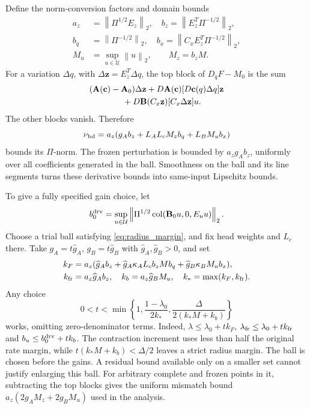 \documentclass[journal]{IEEEtran}
\newcommand{\vz}{\mathbf{z}}
\newcommand{\vc}{\mathbf{c}}
\newcommand{\mA}{\mathbf{A}}
\newcommand{\mB}{\mathbf{B}}
\newcommand{\norm}[1]{\left\lVert #1\right\rVert}
\newcommand{\col}{\operatorname{col}}
\begin{document}
Define the norm-conversion factors and domain bounds
\begin{equation}
\begin{split}
a_z&=\norm{\Pi^{1/2}E_z}_2,\quad
b_z=\norm{E_z^T\Pi^{-1/2}}_2,\\
b_q&=\norm{\Pi^{-1/2}}_2,\quad
b_x=\norm{C_xE_z^T\Pi^{-1/2}}_2,\\
M_u&=\sup_{u\in\mathcal U}\norm{u}_2,\qquad M_z=b_zM.
\end{split}
\label{eq:norm_conversion}
\end{equation}
For a variation $\Delta q$, with $\Delta\vz=E_z^T\Delta q$, the top block of $D_qF-M_0$ is the sum
\begin{equation}
\begin{split}
&(\mA(\vc)-\mA_0)\Delta\vz
+D\mA(\vc)[D\vc(q)\Delta q]\vz\\
&\hspace{14mm}+D\mB(C_x\vz)[C_x\Delta\vz]u.
\end{split}
\label{eq:full_derivative}
\end{equation}
The other blocks vanish. Therefore
\begin{equation}
\nu_{\rm bd}=a_z(g_A b_z+L_A L_cM_zb_q+L_BM_ub_x)
\label{eq:derivative_budget}
\end{equation}
bounds its $\Pi$-norm. The frozen perturbation is bounded by $a_zg_A b_z$, uniformly over all coefficients generated in the ball. Smoothness on the ball and its line segments turns these derivative bounds into same-input Lipschitz bounds.

To give a fully specified gain choice, let
\begin{equation*}
b_0^{\rm drv}=\sup_{u\in\mathcal U}
\norm{\Pi^{1/2}\col(\mB_0u,0,E_uu)}_2.
\end{equation*}
Choose a trial ball satisfying \eqref{eq:radius_margin}, and fix head weights and $L_c$ there. Take $g_A=t\widehat g_A$, $g_B=t\widehat g_B$ with $\widehat g_A,\widehat g_B>0$, and set
\begin{equation}
\begin{split}
k_F&=a_z(\widehat g_A b_z+\widehat g_A\kappa_A L_c b_zMb_q
+\widehat g_B\kappa_BM_ub_x),\\
k_{\rm fr}&=a_z\widehat g_A b_z,\quad k_b=a_z\widehat g_BM_u,
\quad k_* =\max(k_F,k_{\rm fr}).
\end{split}
\label{eq:gain_coefficients}
\end{equation}
Any choice
\begin{equation}
0<t<\min\left\{1,\frac{1-\lambda_0}{2k_*},
\frac{\Delta}{2(k_*M+k_b)}\right\}
\label{eq:gain_choice}
\end{equation}
works, omitting zero-denominator terms. Indeed, $\lambda\le\lambda_0+tk_F$, $\lambda_{\rm fr}\le\lambda_0+tk_{\rm fr}$ and $b_u\le b_0^{\rm drv}+tk_b$. The contraction increment uses less than half the original rate margin, while $t(k_*M+k_b)<\Delta/2$ leaves a strict radius margin. The ball is chosen before the gains. A residual bound available only on a smaller set cannot justify enlarging this ball. For arbitrary complete and frozen points in it, subtracting the top blocks gives the uniform mismatch bound $a_z(2g_AM_z+2g_BM_u)$ used in the analysis.
\end{document}
